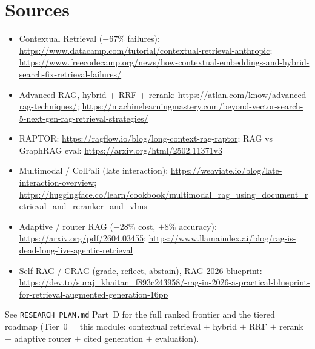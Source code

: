 \documentclass[11pt]{article}
\newcommand{\file}[1]{\texttt{#1}}
\begin{document}
\section{Sources}

\begin{itemize}[leftmargin=*]
  \item Contextual Retrieval ($-67\%$ failures):
        \url{https://www.datacamp.com/tutorial/contextual-retrieval-anthropic};
        \url{https://www.freecodecamp.org/news/how-contextual-embeddings-and-hybrid-search-fix-retrieval-failures/}
  \item Advanced RAG, hybrid + RRF + rerank:
        \url{https://atlan.com/know/advanced-rag-techniques/};
        \url{https://machinelearningmastery.com/beyond-vector-search-5-next-gen-rag-retrieval-strategies/}
  \item RAPTOR: \url{https://ragflow.io/blog/long-context-rag-raptor};
        RAG vs GraphRAG eval: \url{https://arxiv.org/html/2502.11371v3}
  \item Multimodal / ColPali (late interaction):
        \url{https://weaviate.io/blog/late-interaction-overview};
        \url{https://huggingface.co/learn/cookbook/multimodal_rag_using_document_retrieval_and_reranker_and_vlms}
  \item Adaptive / router RAG ($-28\%$ cost, $+8\%$ accuracy):
        \url{https://arxiv.org/pdf/2604.03455};
        \url{https://www.llamaindex.ai/blog/rag-is-dead-long-live-agentic-retrieval}
  \item Self-RAG / CRAG (grade, reflect, abstain), RAG 2026 blueprint:
        \url{https://dev.to/suraj_khaitan_f893c243958/-rag-in-2026-a-practical-blueprint-for-retrieval-augmented-generation-16pp}
\end{itemize}

\noindent See \file{RESEARCH\_PLAN.md} Part~D for the full ranked frontier and the tiered roadmap
(Tier~0 = this module: contextual retrieval $+$ hybrid $+$ RRF $+$ rerank $+$ adaptive router $+$
cited generation $+$ evaluation).
\end{document}
